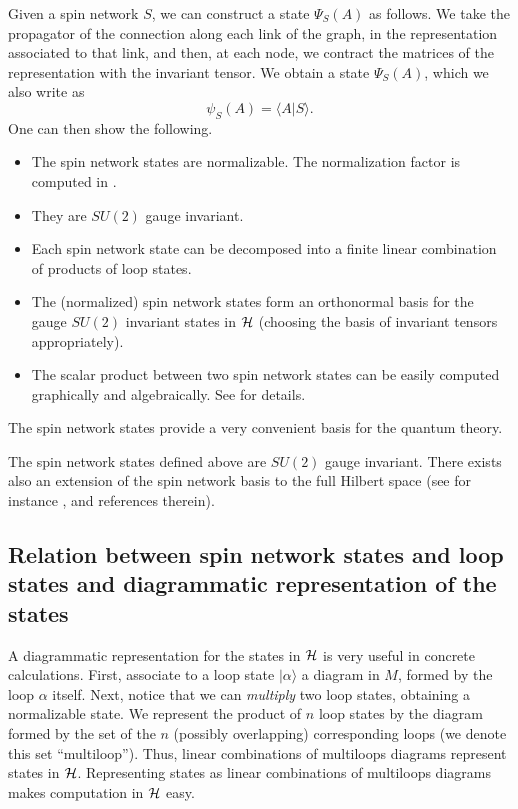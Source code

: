 \documentclass[12pt]{article}
\begin{document}
Given a spin network $S$, we can construct a state $\Psi_{S}(A)$ 
as follows.  We take the propagator of the connection along each 
link of the graph, in the representation associated to that link, 
and then, at each node, we contract the matrices of the 
representation with the invariant tensor.  We obtain a state 
$\Psi_{S}(A)$, which we also write as
\begin{equation}
	\psi_{S}(A) = \langle A |S \rangle . 
\end{equation}
One can then show the following. 
\begin{itemize}
 \item The spin network states are normalizable.  The 
 normalization factor is computed in \cite{DePietriRovelli}.  
 \item They are $SU(2)$ gauge invariant.  
 \item Each spin network state can be decomposed into a finite 
 linear combination of products of loop states.
 \item The (normalized) spin network states form an orthonormal 
 basis for the gauge $SU(2)$ invariant states in $\cal H$ 
 (choosing the basis of invariant tensors appropriately).
 \item The scalar product between two spin network states can be 
 easily computed graphically and algebraically.  See 
 \cite{DePietriRovelli} for details.
\end{itemize}
The spin network states provide a very convenient basis for the 
quantum theory.  

The spin network states defined above are $SU(2)$ gauge 
invariant.  There exists also an extension of the spin network 
basis to the full Hilbert space (see for instance 
\cite{AshtekarLewandowskiArea2,BorissovEtAl97}, and references 
therein).

\subsection{Relation between spin network states and loop 
states and diagrammatic representation of the states}

A diagrammatic representation for the states in $\cal H$ is very 
useful in concrete calculations. 
First, associate to a loop state $|\alpha\rangle$ a diagram 
in $M$, formed by the loop $\alpha$ itself.  Next, notice that we 
can {\em multiply\/} two loop states, obtaining a normalizable 
state.  We represent the product of $n$ loop states by the 
diagram formed by the set of the $n$ (possibly overlapping) 
corresponding loops (we denote this set ``multiloop'').  Thus, 
linear combinations of multiloops diagrams represent states in 
$\cal H$.  Representing states as linear combinations of 
multiloops diagrams makes computation in $\cal H$  
easy.
\end{document}
